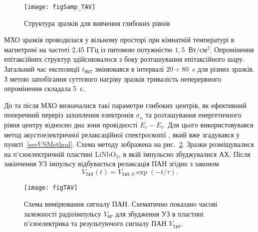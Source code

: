 \begin{figure}
\center
\texttt{[image: figSamp\_TAV]}
\caption{\label{figSamp_TAV}
Структура зразків для вивчення глибоких рівнів}%
\end{figure}

МХО зразків проводилася у вільному просторі при кімнатній температурі в магнетроні на частоті 2,45 ГГц із питомою потужністю  $1,5$~Вт/см$^2$.
Опромінення епітаксійних структур здійснювалося з боку розташування епітаксійного шару.
Загальний час експозиції $t_\mathtt{MWT}$ змінювався в інтервалі $20\div80$~c для різних зразків.
З метою запобігання суттєвого нагріву зразків тривалість неперервного опромінення складала 5~с.

До та після МХО визначалися такі параметри глибоких центрів, як ефективний поперечний переріз захоплення електронів $\sigma_n$
та розташування енергетичного рівня центру відносно дна зони провідності $E_c-E_t$.
Для цього використовувався метод акустоелектричної релаксаційної спектроскопії \cite{Saiko1993,OstrovPAN,OlikhSSC},
який вже згадувався у пункті~\ref{secUSMethod}.
Схема методу зображена на рис.~\ref{figTAV}.
Зразки розміщувалися на п'єзоелектричній пластині LiNbO$_3$, в якій імпульсно збуджувалися АХ.
Після закінчення УЗ імпульсу відбувається релаксація ПАН згідно з законом
\begin{equation}\label{eqVtav}
  V_\mathtt{TAV}(t)=V_{\mathtt{TAV},0}\exp(-t/\tau).
\end{equation}

\begin{figure}
\center
\texttt{[image: figTAV]}
\caption{\label{figTAV}
Схема вимірювання сигналу ПАН.
Схематично показано часові залежності радіоімпульсу $V_\mathtt{RF}$ для збудження УЗ в пластині п'єзоелектрика
та результуючого сигналу ПАН $V_\mathtt{TAV}$.
}%
\end{figure}

